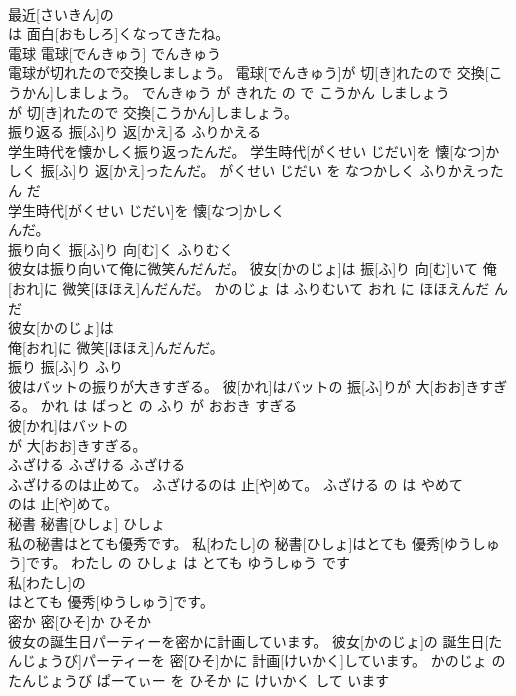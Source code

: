 \documentclass[8pt]{extreport}
\begin{document}
\begin{CJK}{UTF8}{min}
\\	最近[さいきん]の
\\	は 面白[おもしろ]くなってきたね。			
\\	電球	電球[でんきゅう]	でんきゅう	
\\	電球が切れたので交換しましょう。	電球[でんきゅう]が 切[き]れたので 交換[こうかん]しましょう。	でんきゅう が きれた の で こうかん しましょう	
\\	が 切[き]れたので 交換[こうかん]しましょう。			
\\	振り返る	振[ふ]り 返[かえ]る	ふりかえる	
\\	学生時代を懐かしく振り返ったんだ。	学生時代[がくせい じだい]を 懐[なつ]かしく 振[ふ]り 返[かえ]ったんだ。	がくせい じだい を なつかしく ふりかえった ん だ	
\\	学生時代[がくせい じだい]を 懐[なつ]かしく
\\	んだ。			
\\	振り向く	振[ふ]り 向[む]く	ふりむく	
\\	彼女は振り向いて俺に微笑んだんだ。	彼女[かのじょ]は 振[ふ]り 向[む]いて 俺[おれ]に 微笑[ほほえ]んだんだ。	かのじょ は ふりむいて おれ に ほほえんだ ん だ	
\\	彼女[かのじょ]は
\\	俺[おれ]に 微笑[ほほえ]んだんだ。			
\\	振り	振[ふ]り	ふり	
\\	彼はバットの振りが大きすぎる。	彼[かれ]はバットの 振[ふ]りが 大[おお]きすぎる。	かれ は ばっと の ふり が おおき すぎる	
\\	彼[かれ]はバットの
\\	が 大[おお]きすぎる。			
\\	ふざける	ふざける	ふざける	
\\	ふざけるのは止めて。	ふざけるのは 止[や]めて。	ふざける の は やめて	
\\	のは 止[や]めて。			
\\	秘書	秘書[ひしょ]	ひしょ	
\\	私の秘書はとても優秀です。	私[わたし]の 秘書[ひしょ]はとても 優秀[ゆうしゅう]です。	わたし の ひしょ は とても ゆうしゅう です	
\\	私[わたし]の
\\	はとても 優秀[ゆうしゅう]です。			
\\	密か	密[ひそ]か	ひそか	
\\	彼女の誕生日パーティーを密かに計画しています。	彼女[かのじょ]の 誕生日[たんじょうび]パーティーを 密[ひそ]かに 計画[けいかく]しています。	かのじょ の たんじょうび ぱーてぃー を ひそか に けいかく して います	

\end{CJK}
\end{document}
